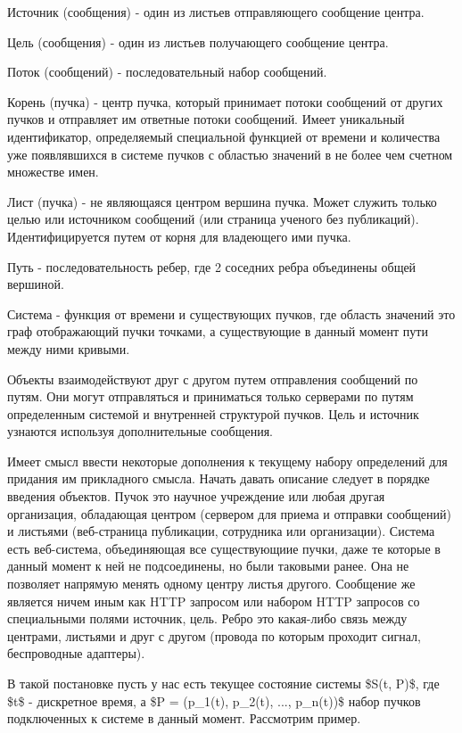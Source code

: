 Источник (сообщения) - один из листьев отправляющего сообщение центра.

Цель (сообщения) - один из листьев получающего сообщение центра.

Поток (сообщений) - последовательный набор сообщений.

Корень (пучка) - центр пучка, который принимает потоки сообщений от
других пучков и отправляет им ответные потоки сообщений. Имеет
уникальный идентификатор, определяемый специальной функцией от времени и
количества уже появлявшихся в системе пучков с областью значений в не
более чем счетном множестве имен.

Лист (пучка) - не являющаяся центром вершина пучка. Может служить только
целью или источником сообщений (или страница ученого без публикаций).
Идентифицируется путем от корня для владеющего ими пучка.

Путь - последовательность ребер, где 2 соседних ребра объединены общей
вершиной.

Система - функция от времени и существующих пучков, где область значений
это граф отображающий пучки точками, а существующие в данный момент пути
между ними кривыми.

Объекты взаимодействуют друг с другом путем отправления сообщений по
путям. Они могут отправляться и приниматься только серверами по путям
определенным системой и внутренней структурой пучков. Цель и источник
узнаются используя дополнительные сообщения.

Имеет смысл ввести некоторые дополнения к текущему набору определений
для придания им прикладного смысла. Начать давать описание следует в
порядке введения объектов. Пучок это научное учреждение или любая другая
организация, обладающая центром (сервером для приема и отправки
сообщений) и листьями (веб-страница публикации, сотрудника или
организации). Система есть веб-система, объединяющая все существующиие
пучки, даже те которые в данный момент к ней не подсоединены, но были
таковыми ранее. Она не позволяет напрямую менять одному центру листья
другого. Сообщение же является ничем иным как HTTP запросом или набором
HTTP запросов со специальными полями источник, цель. Ребро это
какая-либо связь между центрами, листьями и друг с другом (провода по
которым проходит сигнал, беспроводные адаптеры).

В такой постановке пусть у нас есть текущее состояние системы \$S(t,
P)\$, где \$t\$ - дискретное время, а \$P = (p\_1(t), p\_2(t), ...,
p\_n(t))\$ набор пучков подключенных к системе в данный момент.
Рассмотрим пример.

